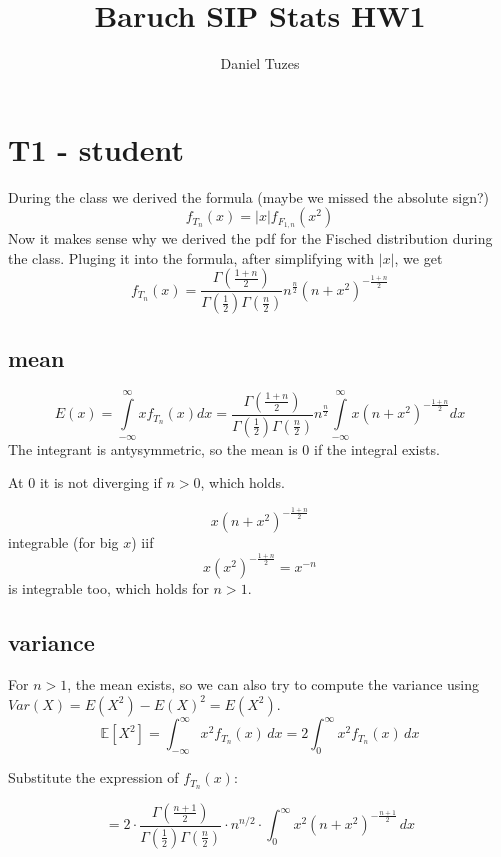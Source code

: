 \documentclass{article}
\title{Baruch SIP Stats HW1}
\author{Daniel Tuzes}
\begin{document}
\maketitle
\tableofcontents

\section{T1 - student}
During the class we derived the formula (maybe we missed the absolute sign?)
\[{f_{{T_n}}}\left( x \right) = \left| x \right|{f_{{F_{1,n}}}}\left( {{x^2}} \right)\]
Now it makes sense why we derived the pdf for the Fisched distribution during the class.
Pluging it into the formula, after simplifying with \(\left| x \right|\), we get
\[{f_{{T_n}}}\left( x \right) = \frac{{\Gamma \left( {\frac{{1 + n}}{2}} \right)}}{{\Gamma \left( {\frac{1}{2}} \right)\Gamma \left( {\frac{n}{2}} \right)}}{n^{\frac{n}{2}}}{\left( {n + {x^2}} \right)^{ - \frac{{1 + n}}{2}}}\]

\subsection{mean}
\[E\left( x \right) = \int\limits_{ - \infty }^\infty  {x{f_{{T_n}}}\left( x \right)dx}  = \frac{{\Gamma \left( {\frac{{1 + n}}{2}} \right)}}{{\Gamma \left( {\frac{1}{2}} \right)\Gamma \left( {\frac{n}{2}} \right)}}{n^{\frac{n}{2}}}\int\limits_{ - \infty }^\infty  {x{{\left( {n + {x^2}} \right)}^{ - \frac{{1 + n}}{2}}}dx} \]
The integrant is antysymmetric, so the mean is 0 if the integral exists.

At 0 it is not diverging if $n>0$, which holds.

\[x{\left( {n + {x^2}} \right)^{ - \frac{{1 + n}}{2}}}\]
integrable (for big $x$) iif \[x{\left( {{x^2}} \right)^{ - \frac{{1 + n}}{2}}} = {x^{ - n}}\] is integrable too,
which holds for $n>1$.

\subsection{variance}
For $n>1$, the mean exists, so we can also try to compute the variance using $Var(X) = E(X^2) - E(X)^2 = E(X^2)$.
\[
    \mathbb{E}[X^2] = \int_{-\infty}^\infty x^2 f_{T_n}(x) \, dx
    = 2 \int_0^\infty x^2 f_{T_n}(x) \, dx
\]

Substitute the expression of $f_{T_n}(x)$:

\[
    = 2 \cdot \frac{\Gamma\left( \frac{n+1}{2} \right)}{\Gamma\left( \frac{1}{2} \right)\Gamma\left( \frac{n}{2} \right)} \cdot n^{n/2}
    \cdot \int_0^\infty x^2 (n + x^2)^{-\frac{n+1}{2}} \, dx
\]
\end{document}
